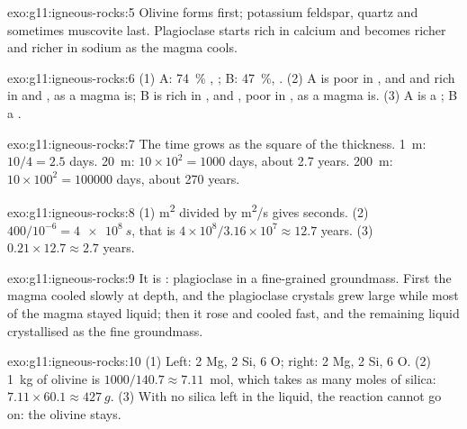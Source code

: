 \begin{solution}{exo:g11:igneous-rocks:5}
Olivine forms first; potassium feldspar, quartz and sometimes muscovite
last. Plagioclase starts rich in calcium and becomes richer and richer in
sodium as the magma cools.
\end{solution}

\begin{solution}{exo:g11:igneous-rocks:6}
(1) A: \qty{74}{\percent} , ; B: \qty{47}{\percent}, .
(2) A is poor in ,  and  and rich in  and
, as a  magma is; B is rich in ,  and ,
poor in , as a  magma is. (3) A is a ; B a .
\end{solution}

\begin{solution}{exo:g11:igneous-rocks:7}
The time grows as the square of the thickness. \qty{1}{m}: $10/4 = 2.5$
days. \qty{20}{m}: $10 \times 10^2 = 1000$ days, about 2.7 years.
\qty{200}{m}: $10 \times 100^2 = \num{100000}$ days, about 270 years.
\end{solution}

\begin{solution}{exo:g11:igneous-rocks:8}
(1) \unit{m^2} divided by \unit{m^2/s} gives seconds. (2) $400/10^{-6} =
\qty{4e8}{s}$, that is $4 \times 10^8 / 3.16 \times 10^7 \approx 12.7$
years. (3) $0.21 \times 12.7 \approx 2.7$ years.
\end{solution}

\begin{solution}{exo:g11:igneous-rocks:9}
It is : plagioclase  in a fine-grained groundmass.
First the magma cooled slowly at depth, and the plagioclase crystals grew
large while most of the magma stayed liquid; then it rose and cooled fast,
and the remaining liquid crystallised as the fine groundmass.
\end{solution}

\begin{solution}{exo:g11:igneous-rocks:10}
(1) Left: 2 Mg, 2 Si, 6 O; right: 2 Mg, 2 Si, 6 O. (2) \qty{1}{kg} of
olivine is $1000/140.7 \approx 7.11$~mol, which takes as many moles of
silica: $7.11 \times 60.1 \approx \qty{427}{g}$. (3) With no silica left in
the liquid, the reaction cannot go on: the olivine stays.
\end{solution}

